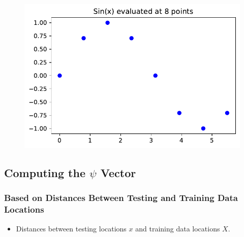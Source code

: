 \documentclass[
  letterpaper,
  DIV=11,
  numbers=noendperiod]{scrreprt}
\providecommand{\tightlist}{%
  \setlength{\itemsep}{0pt}\setlength{\parskip}{0pt}}\usepackage{longtable,booktabs,array}
\begin{document}
\begin{figure}[H]

{\centering \includegraphics{006_num_gp_files/figure-pdf/cell-40-output-1.pdf}

}

\end{figure}

\hypertarget{computing-the-psi-vector}{%
\subsection{\texorpdfstring{Computing the \(\psi\)
Vector}{Computing the \textbackslash psi Vector}}\label{computing-the-psi-vector}}

\hypertarget{based-on-distances-between-testing-and-training-data-locations}{%
\subsubsection{Based on Distances Between Testing and Training Data
Locations}\label{based-on-distances-between-testing-and-training-data-locations}}

\begin{itemize}
\tightlist
\item
  Distances between testing locations \(x\) and training data locations
  \(X\).
\end{itemize}
\end{document}

